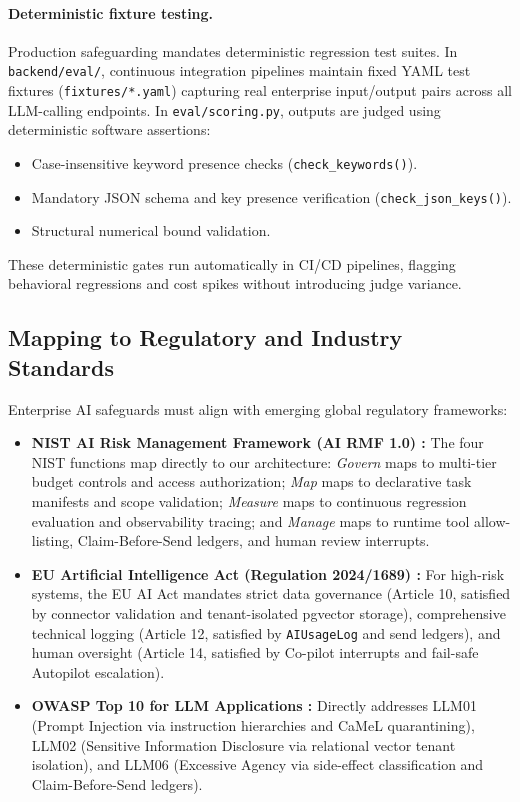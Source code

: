 \documentclass[10pt,a4paper,twocolumn]{article}
\begin{document}
\paragraph{Deterministic fixture testing.} Production safeguarding mandates deterministic regression test suites. In \texttt{backend/eval/}, continuous integration pipelines maintain fixed YAML test fixtures (\texttt{fixtures/*.yaml}) capturing real enterprise input/output pairs across all LLM-calling endpoints. In \texttt{eval/scoring.py}, outputs are judged using deterministic software assertions:
\begin{itemize}[leftmargin=*]
  \item Case-insensitive keyword presence checks (\texttt{check\_keywords()}).
  \item Mandatory JSON schema and key presence verification (\texttt{check\_json\_keys()}).
  \item Structural numerical bound validation.
\end{itemize}
These deterministic gates run automatically in CI/CD pipelines, flagging behavioral regressions and cost spikes without introducing judge variance.

\subsection{Mapping to Regulatory and Industry Standards}
Enterprise AI safeguards must align with emerging global regulatory frameworks:
\begin{itemize}[leftmargin=*]
  \item \textbf{NIST AI Risk Management Framework (AI RMF 1.0) \cite{nist2023airmf}:} The four NIST functions map directly to our architecture: \emph{Govern} maps to multi-tier budget controls and access authorization; \emph{Map} maps to declarative task manifests and scope validation; \emph{Measure} maps to continuous regression evaluation and observability tracing; and \emph{Manage} maps to runtime tool allow-listing, Claim-Before-Send ledgers, and human review interrupts.
  \item \textbf{EU Artificial Intelligence Act (Regulation 2024/1689) \cite{euaiact2024}:} For high-risk systems, the EU AI Act mandates strict data governance (Article 10, satisfied by connector validation and tenant-isolated pgvector storage), comprehensive technical logging (Article 12, satisfied by \texttt{AIUsageLog} and send ledgers), and human oversight (Article 14, satisfied by Co-pilot interrupts and fail-safe Autopilot escalation).
  \item \textbf{OWASP Top 10 for LLM Applications \cite{owasp2025llm}:} Directly addresses LLM01 (Prompt Injection via instruction hierarchies and CaMeL quarantining), LLM02 (Sensitive Information Disclosure via relational vector tenant isolation), and LLM06 (Excessive Agency via side-effect classification and Claim-Before-Send ledgers).
\end{itemize}
\end{document}
